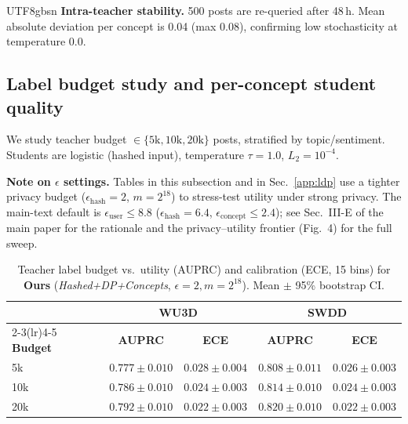 \documentclass[acmsmall,natbib]{acmart}
\begin{document}
\begin{CJK*}{UTF8}{gbsn}
\noindent\textbf{Intra-teacher stability.} 500 posts are re-queried after 48\,h. Mean absolute deviation per concept is 0.04 (max 0.08), confirming low stochasticity at temperature 0.0.

\subsection{Label budget study and per-concept student quality}
\label{app:teacher-budget}
We study teacher budget $\in\{5\text{k},10\text{k},20\text{k}\}$ posts, stratified by topic/sentiment. Students are logistic (hashed input), temperature $\tau{=}1.0$, $L_2{=}10^{-4}$.

\noindent\textbf{Note on $\epsilon$ settings.} Tables in this subsection and in Sec.~\ref{app:ldp} use a tighter privacy budget ($\epsilon_{\text{hash}}{=}2$, $m{=}2^{18}$) to stress-test utility under strong privacy. The main-text default is $\epsilon_{\text{user}}{\le}8.8$ ($\epsilon_{\text{hash}}{=}6.4$, $\epsilon_{\text{concept}}{\le}2.4$); see Sec.~III-E of the main paper for the rationale and the privacy--utility frontier (Fig.~4) for the full sweep.

\begin{table}[h]
\centering
\caption{Teacher label budget vs.\ utility (AUPRC) and calibration (ECE, 15 bins) for \textbf{Ours} (\emph{Hashed+DP+Concepts}, $\epsilon{=}2, m{=}2^{18}$). Mean $\pm$ 95\% bootstrap CI.}
\label{tab:budget}
\setlength{\tabcolsep}{4.2pt}
\begin{tabular}{lcccc}
\toprule
& \multicolumn{2}{c}{WU3D} & \multicolumn{2}{c}{SWDD} \\
\cmidrule(lr){2-3}\cmidrule(lr){4-5}
\textbf{Budget} & \textbf{AUPRC} & \textbf{ECE} & \textbf{AUPRC} & \textbf{ECE} \\
\midrule
5k  & $0.777{\pm}0.010$ & $0.028{\pm}0.004$ & $0.808{\pm}0.011$ & $0.026{\pm}0.003$ \\
10k & $0.786{\pm}0.010$ & $0.024{\pm}0.003$ & $0.814{\pm}0.010$ & $0.024{\pm}0.003$ \\
20k & $0.792{\pm}0.010$ & $0.022{\pm}0.003$ & $0.820{\pm}0.010$ & $0.022{\pm}0.003$ \\
\bottomrule
\end{tabular}
\end{table}


\end{CJK*}
\end{document}
